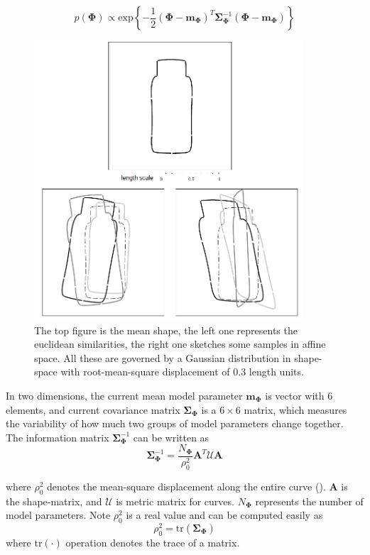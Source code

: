 \begin{equation}
  \label{eq:prior}
   p(\mathbf{\Phi}) \propto
\mathrm{exp} \left\{ -\frac{1}{2} (\mathbf{\Phi} -
  \mathbf{m}_{\mathbf{\Phi}})^T \mathbf{\Sigma}_{\mathbf{\Phi}}^{-1} (\mathbf{\Phi} -
  \mathbf{m}_{\mathbf{\Phi}}) \right\}
\end{equation}

\begin{figure}[htb]
  \centering
  \includegraphics[width=10cm]{images/prior.jpg}
\caption[Sampling from curve families~\cite{blake1998active}]{The top
  figure is the mean shape, the left one represents the euclidean
  similarities, the right one
  sketches some samples in affine space. All these are governed by a
  Gaussian distribution in shape-space with root-mean-square
  displacement of 0.3 length units.}
\label{fig:transform}
\end{figure}

In two dimensions, the current mean model parameter
$\mathbf{m}_{\mathbf{\Phi}}$ is vector with $6$ elements, and current
covariance matrix $\mathbf{\Sigma}_{\mathbf{\Phi}}$ is a $6 \times 6$ matrix, which measures the variability of
how much two groups of model parameters change together. The
information matrix $\mathbf{\Sigma}_{\mathbf{\Phi}}^{-1}$ can be
written as 
\begin{equation}
  \label{eq:infomatrix}
  \mathbf{\Sigma}_{\mathbf{\Phi}}^{-1} = \frac{N_{\mathbf{\Phi}}}{\rho_0^2} \mathbf{A}^T\mathcal{U}\mathbf{A}
\end{equation}

where $\rho_0^2$ denotes the mean-square displacement along the entire
curve (\cite{blake1998active}). $\mathbf{A}$ is the shape-matrix, and $\mathcal{U}$ is
metric matrix for curves. $N_{\mathbf{\Phi}}$ represents
the number of model parameters. Note $\rho_0^2$
is a real value and can be computed easily as 
\begin{equation}
  \label{eq:trace}
  \rho_0^2 = \mathrm{tr}(\mathbf{\Sigma}_{\mathbf{\Phi}})
\end{equation}
where $\mathrm{tr}(\cdot)$ operation denotes the trace of a matrix.

